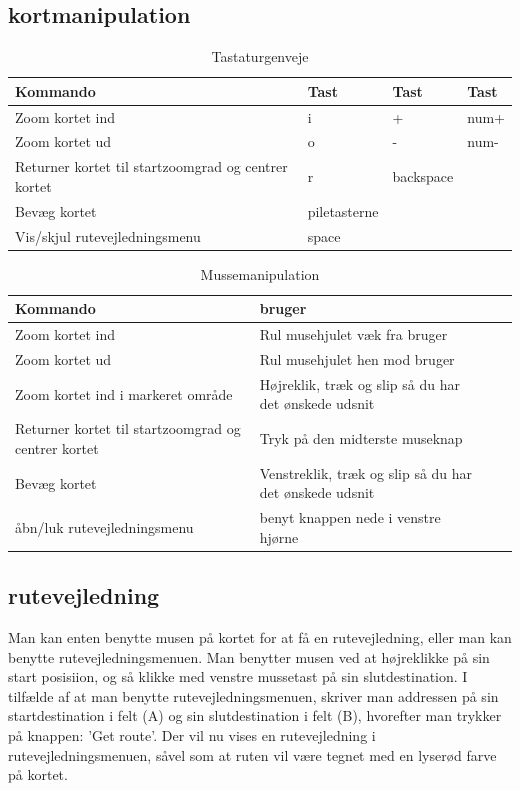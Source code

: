\subsection{kortmanipulation}
\begin{table}[h!t]
\centering
	\caption{Tastaturgenveje}
	\begin{tabular}{p{3cm} l l l}
		\hline\hline
		Kommando & Tast & Tast & Tast \\ [0.5ex]
		\hline
		Zoom kortet ind & i & + & num+\\
		Zoom kortet ud & o & - & num-\\
		Returner kortet til startzoomgrad og centrer kortet & r & backspace\\
		Bevæg kortet & piletasterne\\
		Vis/skjul rutevejledningsmenu & space \\
		\hline
	\end{tabular}
\end{table}

\begin{table}[h!t]
\centering
	\caption{Mussemanipulation}
	\begin{tabular}{p{3cm} l l p{5cm}}
		\hline\hline
		Kommando & bruger \\ [0.5ex]
		\hline
		Zoom kortet ind & Rul musehjulet væk fra bruger\\
		Zoom kortet ud & Rul musehjulet hen mod bruger\\
		Zoom kortet ind i markeret område & Højreklik, træk og slip så du har det ønskede udsnit\\
		Returner kortet til startzoomgrad og centrer kortet & Tryk på den midterste museknap\\
		Bevæg kortet & Venstreklik, træk og slip så du har det ønskede udsnit\\
		åbn/luk rutevejledningsmenu & benyt knappen nede i venstre hjørne\\
		\hline
	\end{tabular}
\end{table}

\subsection{rutevejledning}

Man kan enten  benytte musen på kortet for at få en rutevejledning, eller man kan benytte rutevejledningsmenuen. Man benytter musen ved at højreklikke på sin start posisiion, og så klikke med venstre mussetast på sin slutdestination. I tilfælde af at man benytte rutevejledningsmenuen, skriver man addressen på sin startdestination i felt (A) og sin slutdestination i felt (B), hvorefter man trykker på knappen: 'Get route'. Der vil nu vises en rutevejledning i rutevejledningsmenuen, såvel som at ruten vil være tegnet med en lyserød farve på kortet.

